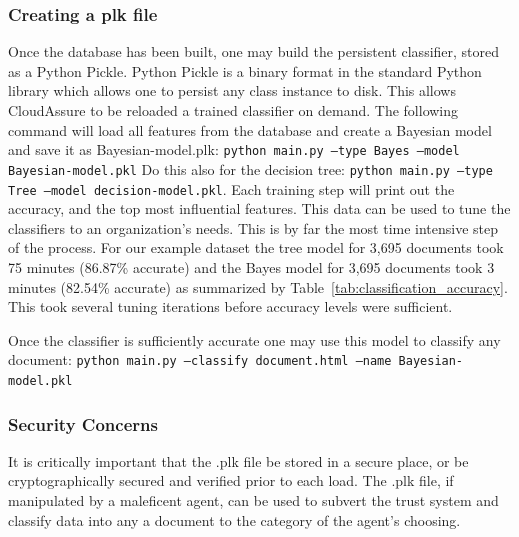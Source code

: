 \subsubsection{Creating a plk file}
Once the database has been built, one may build the persistent classifier,
stored as a Python Pickle. Python Pickle is a binary format in the standard
Python library which allows one to persist any class instance to disk. This
allows CloudAssure to
be reloaded a trained classifier on demand. The following command will load all features from the
database and create a Bayesian model and save it as Bayesian-model.plk: 
\texttt{python main.py --type Bayes --model Bayesian-model.pkl}
Do this also for the decision tree: \texttt{python main.py --type Tree --model
decision-model.pkl}. Each training step will print out the accuracy, and the top
most influential features. This data can be used to tune the classifiers to an organization's needs.
This is by far the most time intensive step of the process. For our example dataset the tree
model for 3,695 documents took 75 minutes (86.87\% accurate) and the Bayes
model for 3,695 documents took 3 minutes (82.54\% accurate) as summarized by
Table~\ref{tab:classification_accuracy}. This took several
tuning iterations before accuracy levels were sufficient.

Once the classifier is sufficiently accurate one may use this model to classify
any document: \texttt{python main.py --classify document.html --name Bayesian-model.pkl}

 

\subsubsection{Security Concerns}
It is critically important that the .plk file be stored in a secure place, or be
cryptographically secured and verified prior to each load. The .plk file, if
manipulated by a maleficent agent, can be used to subvert the trust system and
classify data into any a document to the category of the agent's choosing.  


